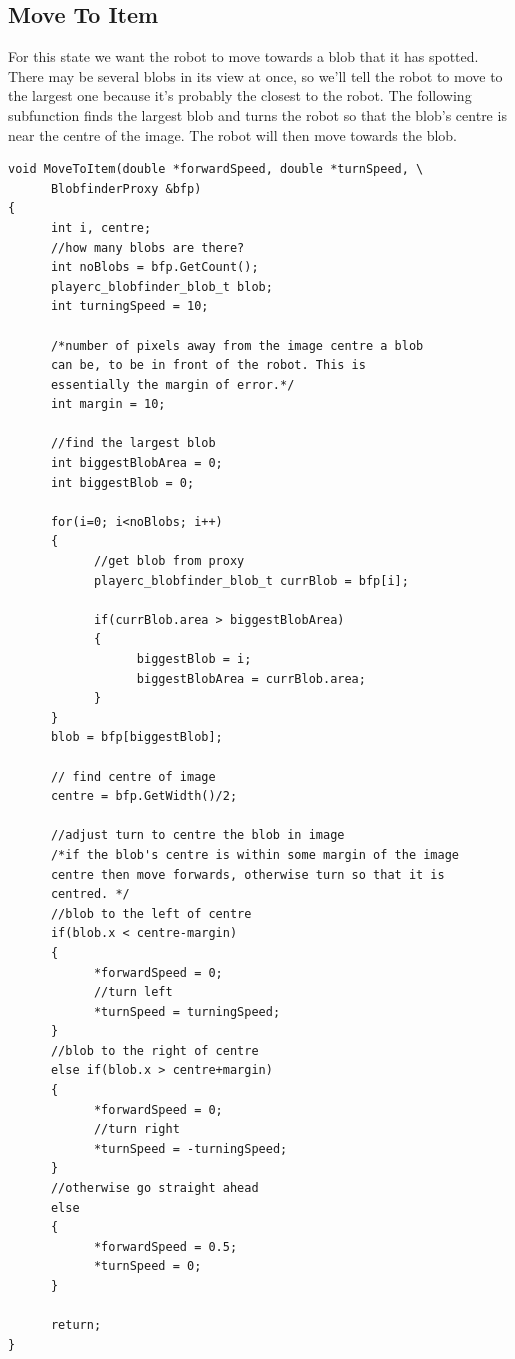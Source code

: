 \documentclass[a4paper]{report}
\begin{document}
\subsection{Move To Item}
For this state we want the robot to move towards a blob that it has spotted. There may be several blobs in its view at once, so we'll tell the robot to move to the largest one because it's probably the closest to the robot. The following subfunction finds the largest blob and turns the robot so that the blob's centre is near the centre of the image. The robot will then move towards the blob.
\begin{verbatim}
void MoveToItem(double *forwardSpeed, double *turnSpeed, \
      BlobfinderProxy &bfp)
{
      int i, centre;
      //how many blobs are there?
      int noBlobs = bfp.GetCount();
      playerc_blobfinder_blob_t blob;
      int turningSpeed = 10;
      
      /*number of pixels away from the image centre a blob
      can be, to be in front of the robot. This is 
      essentially the margin of error.*/
      int margin = 10;

      //find the largest blob      
      int biggestBlobArea = 0;
      int biggestBlob = 0;
      
      for(i=0; i<noBlobs; i++)
      {
            //get blob from proxy
            playerc_blobfinder_blob_t currBlob = bfp[i];
            
            if(currBlob.area > biggestBlobArea)
            {
                  biggestBlob = i;
                  biggestBlobArea = currBlob.area;
            }
      }
      blob = bfp[biggestBlob];
            
      // find centre of image
      centre = bfp.GetWidth()/2;
      
      //adjust turn to centre the blob in image
      /*if the blob's centre is within some margin of the image 
      centre then move forwards, otherwise turn so that it is 
      centred. */
      //blob to the left of centre
      if(blob.x < centre-margin)
      {
            *forwardSpeed = 0;
            //turn left
            *turnSpeed = turningSpeed;
      }
      //blob to the right of centre
      else if(blob.x > centre+margin)
      {
            *forwardSpeed = 0;
            //turn right
            *turnSpeed = -turningSpeed;
      }
      //otherwise go straight ahead
      else
      {
            *forwardSpeed = 0.5;
            *turnSpeed = 0;      
      }
      
      return;
}
\end{verbatim}
\end{document}
